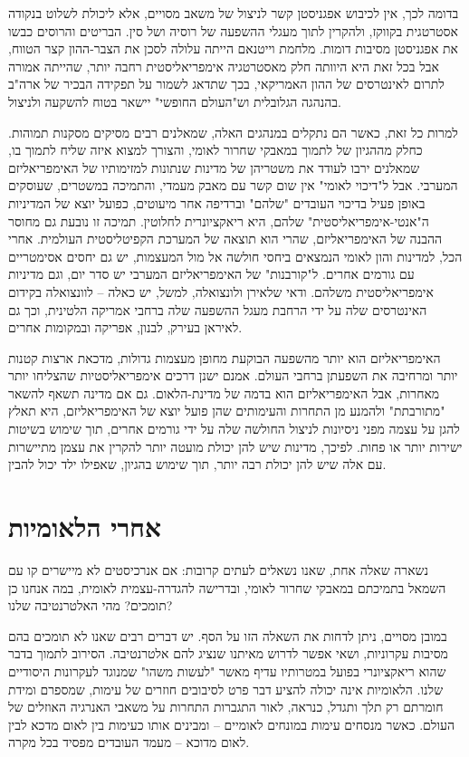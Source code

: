 בדומה לכך, אין לכיבוש אפגניסטן קשר לניצול של משאב מסויים, אלא ליכולת לשלוט בנקודה אסטרטגית בקווקז, ולהקרין לתוך מעגלי ההשפעה של רוסיה ושל סין. הבריטים והרוסים כבשו את אפגניסטן מסיבות דומות. מלחמת וייטנאם הייתה עלולה לסכן את הצבר-ההון קצר הטווח, אבל בכל זאת היא היוותה חלק מאסטרטגיה אימפריאליסטית רחבה יותר, שהייתה אמורה לתרום לאינטרסים של ההון האמריקאי, בכך שתדאג לשמור על תפקידה הבכיר של ארה"ב בהנהגה הגלובלית וש"העולם החופשי" יישאר בטוח להשקעה ולניצול.

למרות כל זאת, כאשר הם נתקלים במנהגים האלה, שמאלנים רבים מסיקים מסקנות תמוהות. כחלק מההגיון של לתמוך במאבקי שחרור לאומי, והצורך למצוא איזה שליח לתמוך בו, שמאלנים ירבו לעודד את משטריהן של מדינות שנתונות למזימותיו של האימפריאליזם המערבי. אבל ל"דיכוי לאומי" אין שום קשר עם מאבק מעמדי, והתמיכה במשטרים, שעוסקים באופן פעיל בדיכוי העובדים "שלהם" וברדיפה אחר מיעוטים, כפועל יוצא של המדיניות ה"אנטי-אימפריאליסטית" שלהם, היא ריאקציונרית לחלוטין. תמיכה זו נובעת גם מחוסר ההבנה של האימפריאליזם, שהרי הוא תוצאה של המערכת הקפיטליסטית העולמית. אחרי הכל, למדינות והון לאומי הנמצאים ביחסי חולשה אל מול המעצמות, יש גם יחסים אסימטריים עם גורמים אחרים. ל"קורבנות" של האימפריאליזם המערבי יש סדר יום, וגם מדיניות אימפריאליסטית משלהם. ודאי שלאירן ולונצואלה, למשל, יש כאלה – לוונצואלה בקידום האינטרסים שלה על ידי הרחבת מעגל ההשפעה שלה ברחבי אמריקה הלטינית, וכך גם לאיראן בעירק, לבנון, אפריקה ובמקומות אחרים.

האימפריאליזם הוא יותר מהשפעה הבוקעת מחופן מעצמות גדולות, מדכאת ארצות קטנות יותר ומרחיבה את השפעתן ברחבי העולם. אמנם ישנן דרכים אימפריאליסטיות שהצליחו יותר מאחרות, אבל האימפריאליזם הוא בדמה של מדינת-הלאום. גם אם מדינה תשאף להשאר "מתורבתת" ולהמנע מן התחרות והעימותים שהן פועל יוצא של האימפריאליזם, היא תאלץ להגן על עצמה מפני ניסיונות לניצול החולשה שלה על ידי גורמים אחרים, תוך שימוש בשיטות ישירות יותר או פחות. לפיכך, מדינות שיש להן יכולת מועטה יותר להקרין את עצמן מתיישרות עם אלה שיש להן יכולת רבה יותר, תוך שימוש בהגיון, שאפילו ילד יכול להבין.



\section{אחרי הלאומיות}

נשארה שאלה אחת, שאנו נשאלים לעתים קרובות: אם אנרכיסטים לא מיישרים קו עם השמאל בתמיכתם במאבקי שחרור לאומי, ובדרישה להגדרה-עצמית לאומית, במה אנחנו כן תומכים? מהי האלטרנטיבה שלנו?

במובן מסויים, ניתן לדחות את השאלה הזו על הסף. יש דברים רבים שאנו לא תומכים בהם מסיבות עקרוניות, ושאי אפשר לדרוש מאיתנו שנציג להם אלטרנטיבה. הסירוב לתמוך בדבר שהוא ריאקציונרי בפועל במטרותיו עדיף מאשר "לעשות משהו" שמנוגד לעקרונות היסודיים שלנו. הלאומיות אינה יכולה להציע דבר פרט לסיבובים חוזרים של עימות, שמספרם ומידת חומרתם רק תלך ותגדל, כנראה, לאור התגברות התחרות על משאבי האנרגיה האוזלים של העולם. כאשר מנסחים עימות במונחים לאומיים – ומבינים אותו כעימות בין לאום מדכא לבין לאום מדוכא – מעמד העובדים מפסיד בכל מקרה.


